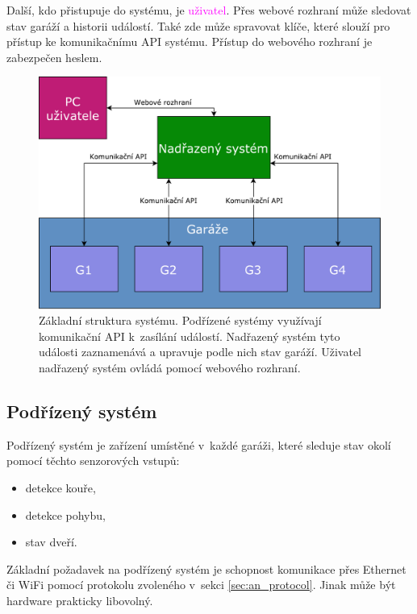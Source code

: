 Další, kdo přistupuje do systému, je \textcolor{magenta}{uživatel}. Přes webové rozhraní může sledovat stav garáží a historii událostí. Také zde může spravovat klíče, které slouží pro přístup ke komunikačnímu API systému. Přístup do webového rozhraní je zabezpečen heslem.

\begin{figure}[h!]
    \centering
    \includegraphics[width=\textwidth]{images/basic_struct.pdf}
    \caption[Základní struktura systému]{Základní struktura systému. Podřízené systémy využívají komunikační API k~zasílání událostí. Nadřazený systém tyto události zaznamenává a upravuje podle nich stav garáží. Uživatel nadřazený systém ovládá pomocí webového rozhraní. }
    \label{fig:basic_struct}
\end{figure}

\subsection{Podřízený systém}
\label{sec:an_subsystem}

Podřízený systém je zařízení umístěné v~každé garáži, které sleduje stav okolí pomocí těchto senzorových vstupů:

\begin{itemize}
    \item detekce kouře,
    \item detekce pohybu,
    \item stav dveří.
\end{itemize}

Základní požadavek na podřízený systém je schopnost komunikace přes Ethernet či WiFi pomocí protokolu zvoleného v~sekci \ref{sec:an_protocol}. Jinak může být hardware prakticky libovolný.

